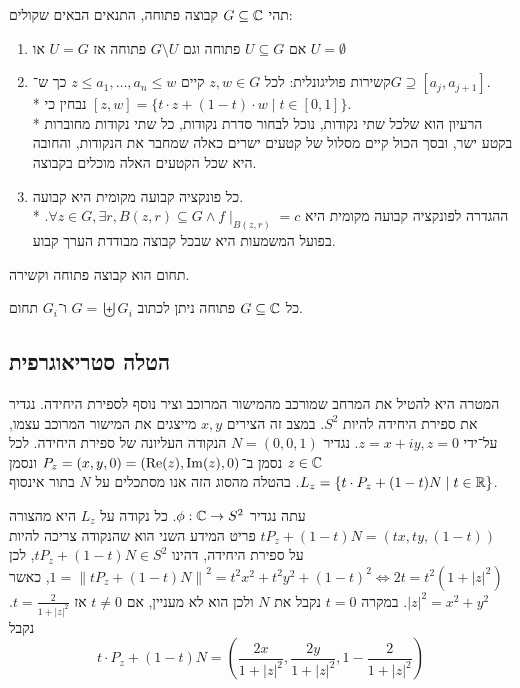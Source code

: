 \begin{definition}[קשירות]
	תהי $G \subseteq \mathbb{C}$ קבוצה פתוחה, התנאים הבאים שקולים:
	\begin{enumerate}
		\item אם $U \subseteq G$ פתוחה וגם $G \setminus U$ פתוחה אז $U = G$ או $U = \emptyset$
		\item קשירות פוליגונלית: לכל $z, w \in G$ קיים $z \le a_1, \dots, a_n \le w$ כך ש־$G \supseteq [a_j, a_{j + 1}]$. \\*
			נבחין כי $[z, w] = \{ t \cdot z + (1 - t) \cdot w \mid t \in [0, 1]\}$. \\*
			הרעיון הוא שלכל שתי נקודות, נוכל לבחור סדרת נקודות, כל שתי נקודות מחוברות בקטע ישר, ובסך הכול קיים מסלול של קטעים ישרים כאלה שמחבר את הנקודות, והחובה היא שכל הקטעים האלה מוכלים בקבוצה.
		\item כל פונקציה קבועה מקומית היא קבועה. \\*
			ההגדרה לפונקציה קבועה מקומית היא $\forall z \in G, \exists r, B(z, r) \subseteq G \land f \mid_{B(z, r)} = c$.
			בפועל המשמעות היא שבכל קבוצה מבודדת הערך קבוע.
	\end{enumerate}
\end{definition}
\begin{definition}[תחום]
	תחום הוא קבוצה פתוחה וקשירה.
\end{definition}
\begin{remark}
	כל $G \subseteq \mathbb{C}$ פתוחה ניתן לכתוב $G = \biguplus G_i$ ו־$G_i$ תחום.
\end{remark}

\subsection{הטלה סטריאוגרפית}
המטרה היא להטיל את המרחב שמורכב מהמישור המרוכב וציר נוסף לספירת היחידה.
נגדיר את ספירת היחידה להיות $S^2$.
במצב זה הצירים $x, y$ מייצגים את המישור המרוכב עצמו, על־ידי $z = x + i y, z = 0$.
נגדיר $N = (0, 0, 1)$ הנקודה העליונה של ספירת היחידה.
לכל $z \in \mathbb{C}$ נסמן ב־$P_z = (x, y, 0) = (\operatorname{Re}(z), \operatorname{Im}(z), 0)$ ונסמן $L_z = \{ t \cdot P_z + (1 - t) N \mid t \in \mathbb{R} \}$.
בהטלה מהסוג הזה אנו מסתכלים על $N$ בתור אינסוף.

עתה נגדיר $\phi : \mathbb{C} \to S^2$.
כל נקודה על $L_z$ היא מהצורה $t P_z + (1 - t) N = (tx, ty, (1 - t))$
פריט המידע השני הוא שהנקודה צריכה להיות על ספירת היחידה, דהינו $t P_z + (1 - t) N \in S^2$,
לכן $1 = {\lVert t P_z + (1 - t) N \rVert}^2 = t^2 x^2 + t^2 y^2 + {(1 - t)}^2 \iff 2t = t^2 (1 + {|z|}^2)$, כאשר ${|z|}^2 = x^2 + y^2$.
במקרה $t = 0$ נקבל את $N$ ולכן הוא לא מעניין, אם $t \ne 0$ אז $t = \frac{2}{1 + {|z|}^2}$.
נקבל
\[
	t \cdot P_z + (1 - t)N = (\frac{2x}{1 + {|z|}^2},\frac{2y}{1 + {|z|}^2}, 1 - \frac{2}{1 + {|z|}^2})
\]

